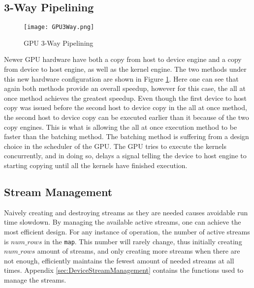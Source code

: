 \subsection{3-Way Pipelining}
\begin{figure}[htp]
\centering
\texttt{[image: GPU3Way.png]}
\caption{GPU 3-Way Pipelining}
\label{fig:GPU3Way}
\end{figure}
Newer GPU hardware have both a copy from host to device engine and a copy from device to host engine, as well as the kernel engine. The two methods under this new hardware configuration are shown in Figure \ref{fig:GPU3Way}. Here one can see that again both methods provide an overall speedup, however for this case, the all at once method achieves the greatest speedup. Even though the first device to host copy was issued before the second host to device copy in the all at once method, the second host to device copy can be executed earlier than it because of the two copy engines. This is what is allowing the all at once execution method to be faster than the batching method. The batching method is suffering from a design choice in the scheduler of the GPU. The GPU tries to execute the kernels concurrently, and in doing so, delays a signal telling the device to host engine to starting copying until all the kernels have finished execution.

\subsection{Stream Management}
Naively creating and destroying streams as they are needed causes avoidable run time slowdown. By managing the available active streams, one can achieve the most efficient design. For any instance of operation, the number of active streams is $num\_rows$ in the \verb|map|. This number will rarely change, thus initially creating $num\_rows$ amount of streams, and only creating more streams when there are not enough, efficiently maintains the fewest amount of needed streams at all times. Appendix \ref{sec:DeviceStreamManagement} contains the functions used to manage the streams.